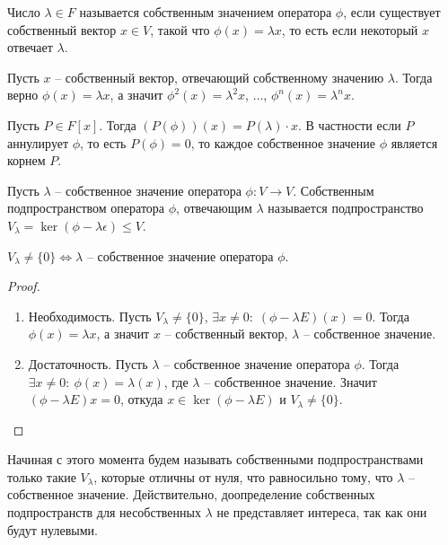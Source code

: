 \begin{definition}
    Число $\lambda \in F$ называется собственным значением оператора $\phi$, если существует собственный 
    вектор $x \in V$, такой что $\phi(x) = \lambda x$, то есть если некоторый $x$ отвечает $\lambda$.
\end{definition}

\begin{note}
    Пусть $x$ -- собственный вектор, отвечающий собственному значению $\lambda$. Тогда верно 
    $\phi(x) = \lambda x$, а значит $\phi^2(x) = \lambda^2 x$, $\dots$, $\phi^n(x) = \lambda^n x$.
\end{note}

\begin{corollary}
    Пусть $P \in F[x]$. Тогда $(P(\phi))(x) = P(\lambda) \cdot x$. В частности 
    если $P$ аннулирует $\phi$, то есть $P(\phi) = 0$, 
    то каждое собственное значение $\phi$ является корнем $P$.
\end{corollary}

\begin{definition}
    Пусть $\lambda$ -- собственное значение оператора $\phi: V \to V$. Собственным подпространством 
    оператора $\phi$, отвечающим $\lambda$ называется подпространство 
    $V_{\lambda} = \ker (\phi - \lambda \epsilon) \leq V$.
\end{definition}

\begin{proposition}
    $V_{\lambda} \neq \{0\} \Leftrightarrow \lambda$ -- собственное значение оператора $\phi$.
\end{proposition}

\begin{proof}~
    \begin{enumerate}
        \item Необходимость. Пусть $V_\lambda \neq \{0\}$, $\exists x \neq 0: \; (\phi - \lambda E)(x) = 0$. 
        Тогда $\phi(x) = \lambda x$, а значит $x$ -- собственный вектор, 
        $\lambda$ -- собственное значение.
        \item Достаточность. Пусть $\lambda$ -- собственное значение оператора $\phi$. 
        Тогда $\exists x \neq 0: \: \phi(x) = \lambda(x)$, где $\lambda$ -- собственное значение.
        Значит $(\phi - \lambda E)x = 0$, откуда $x \in \ker(\phi - \lambda E)$ и $V_\lambda \neq \{0\}.$
    \end{enumerate}
\end{proof}

\begin{note}
    Начиная с этого момента будем называть собственными подпространствами только такие $V_{\lambda}$, 
    которые отличны от нуля, что равносильно тому, что $\lambda$ -- собственное значение. 
    Действительно, доопределение собственных подпространств для несобственных $\lambda$ 
    не представляет интереса, так как они будут нулевыми.
\end{note}

